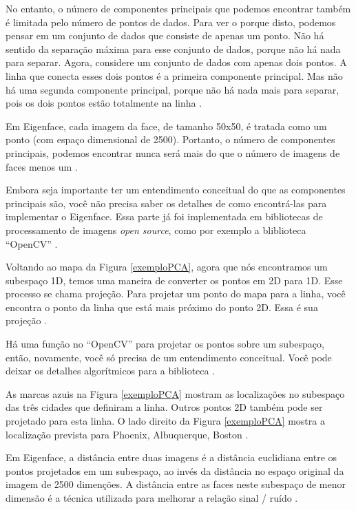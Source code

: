 No entanto, o número de componentes principais que podemos encontrar também é limitada pelo número de pontos de dados. Para ver o porque disto, podemos pensar em um conjunto de dados que consiste de apenas um ponto. Não há sentido da separação máxima para esse conjunto de dados, porque não há nada para separar. Agora, considere um conjunto de dados com apenas dois pontos. A linha que conecta esses dois pontos é a primeira componente principal. Mas não há uma segunda componente principal, porque não há nada mais para separar, pois os dois pontos estão totalmente na linha \cite{hewitt}.

Em Eigenface, cada imagem da face, de tamanho 50x50, é tratada como um ponto (com espaço dimensional de 2500). Portanto, o número de componentes principais, podemos encontrar nunca será mais do que o número de imagens de faces menos um \cite{hewitt}.

Embora seja importante ter um entendimento conceitual do que as componentes principais são, você não precisa saber os detalhes de como encontrá-las para implementar o Eigenface. Essa parte já foi implementada em bibliotecas de processamento de imagens \textit{open source}, como por exemplo a bliblioteca ``OpenCV'' \cite{hewitt}.

Voltando ao mapa da Figura \ref{exemploPCA}, agora que nós encontramos um subespaço 1D, temos uma maneira de converter os pontos em 2D para 1D. Esse processo se chama projeção. Para projetar um ponto do mapa para a linha, você encontra o ponto da linha que está mais próximo do ponto 2D. Essa é sua projeção \cite{hewitt}.

Há uma função no ``OpenCV'' para projetar os pontos sobre um subespaço, então, novamente, você só precisa de um entendimento conceitual. Você pode deixar os detalhes algorítmicos para a biblioteca \cite{hewitt}.

As marcas azuis na Figura \ref{exemploPCA} mostram as localizações no subespaço das três cidades que definiram a linha. Outros pontos 2D também pode ser projetado para esta linha. O lado direito da Figura \ref{exemploPCA} mostra a localização prevista para Phoenix, Albuquerque, Boston \cite{hewitt}.

Em Eigenface, a distância entre duas imagens é a distância euclidiana entre os pontos projetados em um subespaço, ao invés da distância no espaço original da imagem de 2500 dimenções. A distância entre as faces neste subespaço de menor dimensão é a técnica utilizada para melhorar a relação sinal / ruído \cite{hewitt}.

